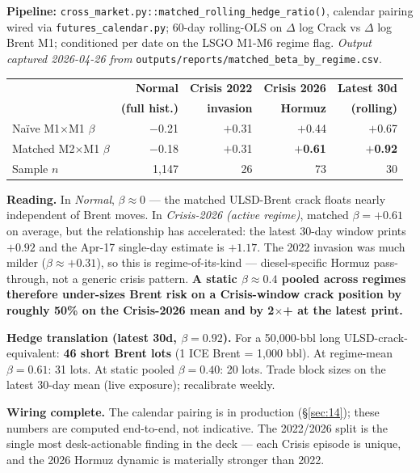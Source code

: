\documentclass[10pt,a4paper]{article}
\begin{document}
\begin{callout}
\footnotesize
\textbf{Pipeline:} \texttt{cross\_market.py::matched\_rolling\_hedge\_ratio()}, calendar pairing wired via \texttt{futures\_calendar.py}; 60-day rolling-OLS on $\Delta$ log Crack vs $\Delta$ log Brent M1; conditioned per date on the LSGO M1-M6 regime flag. \emph{Output captured 2026-04-26 from} \texttt{outputs/reports/matched\_beta\_by\_regime.csv}.
\smallskip

\begin{center}
\begin{tabular}{@{}lrrrr@{}}
                                & \textbf{Normal} & \textbf{Crisis 2022} & \textbf{Crisis 2026} & \textbf{Latest 30d} \\
                                & \textbf{(full hist.)} & \textbf{invasion} & \textbf{Hormuz} & \textbf{(rolling)} \\
\midrule
Naïve M1$\times$M1 $\beta$       & $-$0.21         & $+$0.31              & $+$0.44              & $+$0.67 \\
Matched M2$\times$M1 $\beta$     & $-$0.18         & $+$0.31              & \textbf{$+$0.61}     & \textbf{$+$0.92} \\
Sample $n$                       & 1{,}147         & 26                   & 73                   & 30 \\
\end{tabular}
\end{center}
\smallskip

\textbf{Reading.} In \emph{Normal}, $\beta \approx 0$ — the matched ULSD-Brent crack floats nearly independent of Brent moves. In \emph{Crisis-2026 (active regime)}, matched $\beta = +0.61$ on average, but the relationship has accelerated: the latest 30-day window prints $+0.92$ and the Apr-17 single-day estimate is $+1.17$. The 2022 invasion was much milder ($\beta \approx +0.31$), so this is regime-of-its-kind — diesel-specific Hormuz pass-through, not a generic crisis pattern. \textbf{A static $\beta \approx 0.4$ pooled across regimes therefore under-sizes Brent risk on a Crisis-window crack position by roughly 50\% on the Crisis-2026 mean and by 2$\times$+ at the latest print.}

\textbf{Hedge translation (latest 30d, $\beta=0.92$).} For a 50,000-bbl long ULSD-crack-equivalent: \textbf{46 short Brent lots} (1 ICE Brent = 1,000 bbl). At regime-mean $\beta=0.61$: 31 lots. At static pooled $\beta=0.40$: 20 lots. Trade block sizes on the latest 30-day mean (live exposure); recalibrate weekly.

\textbf{Wiring complete.} The calendar pairing is in production (\S\ref{sec:14}); these numbers are computed end-to-end, not indicative. The 2022/2026 split is the single most desk-actionable finding in the deck --- each Crisis episode is unique, and the 2026 Hormuz dynamic is materially stronger than 2022.
\end{callout}
\end{document}
